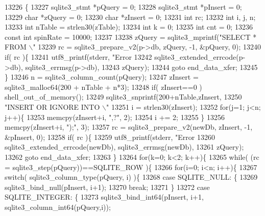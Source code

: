 \begin{DoxyCode}
13226  \{
13227   sqlite3_stmt *pQuery = 0;
13228   sqlite3_stmt *pInsert = 0;
13229   \textcolor{keywordtype}{char} *zQuery = 0;
13230   \textcolor{keywordtype}{char} *zInsert = 0;
13231   \textcolor{keywordtype}{int} rc;
13232   \textcolor{keywordtype}{int} i, j, n;
13233   \textcolor{keywordtype}{int} nTable = strlen30(zTable);
13234   \textcolor{keywordtype}{int} k = 0;
13235   \textcolor{keywordtype}{int} cnt = 0;
13236   \textcolor{keyword}{const} \textcolor{keywordtype}{int} spinRate = 10000;
13237 
13238   zQuery = sqlite3_mprintf(\textcolor{stringliteral}{"SELECT * FROM \(\backslash\)"%
13239   rc = sqlite3_prepare_v2(p->db, zQuery, -1, &pQuery, 0);
13240   \textcolor{keywordflow}{if}( rc )\{
13241     utf8_printf(stderr, \textcolor{stringliteral}{"Error %
13242             sqlite3_extended_errcode(p->db), sqlite3_errmsg(p->db),
13243             zQuery);
13244     \textcolor{keywordflow}{goto} end\_data\_xfer;
13245   \}
13246   n = sqlite3_column_count(pQuery);
13247   zInsert = sqlite3_malloc64(200 + nTable + n*3);
13248   \textcolor{keywordflow}{if}( zInsert==0 ) shell_out_of_memory();
13249   sqlite3_snprintf(200+nTable,zInsert,
13250                    \textcolor{stringliteral}{"INSERT OR IGNORE INTO \(\backslash\)"%
13251   i = strlen30(zInsert);
13252   \textcolor{keywordflow}{for}(j=1; j<n; j++)\{
13253     memcpy(zInsert+i, \textcolor{stringliteral}{",?"}, 2);
13254     i += 2;
13255   \}
13256   memcpy(zInsert+i, \textcolor{stringliteral}{");"}, 3);
13257   rc = sqlite3_prepare_v2(newDb, zInsert, -1, &pInsert, 0);
13258   \textcolor{keywordflow}{if}( rc )\{
13259     utf8_printf(stderr, \textcolor{stringliteral}{"Error %
13260             sqlite3_extended_errcode(newDb), sqlite3_errmsg(newDb),
13261             zQuery);
13262     \textcolor{keywordflow}{goto} end\_data\_xfer;
13263   \}
13264   \textcolor{keywordflow}{for}(k=0; k<2; k++)\{
13265     \textcolor{keywordflow}{while}( (rc = sqlite3_step(pQuery))==SQLITE_ROW )\{
13266       \textcolor{keywordflow}{for}(i=0; i<n; i++)\{
13267         \textcolor{keywordflow}{switch}( sqlite3_column_type(pQuery, i) )\{
13268           \textcolor{keywordflow}{case} SQLITE_NULL: \{
13269             sqlite3_bind_null(pInsert, i+1);
13270             \textcolor{keywordflow}{break};
13271           \}
13272           \textcolor{keywordflow}{case} SQLITE_INTEGER: \{
13273             sqlite3_bind_int64(pInsert, i+1, sqlite3_column_int64(pQuery,i));
}}}}
\end{DoxyCode}
